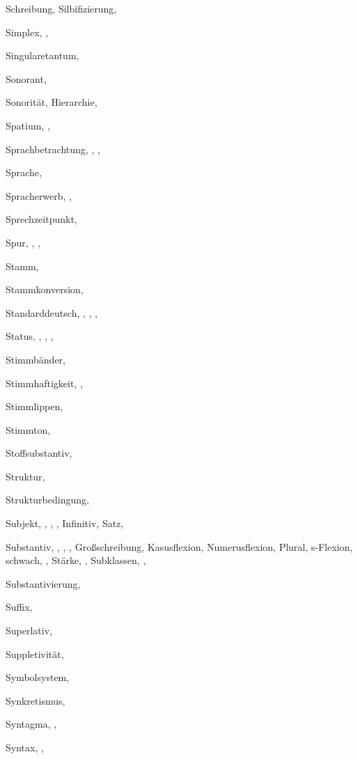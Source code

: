 \begin{theindex}
    \subitem Schreibung, 
    \subitem Silbifizierung, 
  \item Simplex, , 
  \item Singularetantum, 
  \item Sonorant, 
  \item Sonorität, 
    \subitem Hierarchie, 
  \item Spatium, , 
  \item Sprachbetrachtung, , , 
  \item Sprache, 
  \item Spracherwerb, , 
  \item Sprechzeitpunkt, 
  \item Spur, , , 
  \item Stamm, 
  \item Stammkonversion, 
  \item Standarddeutsch, , , , 
  \item Status, , , , 
  \item Stimmbänder, 
  \item Stimmhaftigkeit, , 
  \item Stimmlippen, 
  \item Stimmton, 
  \item Stoffsubstantiv, 
  \item Struktur, 
  \item Strukturbedingung, 
  \item Subjekt, , , , 
    \subitem Infinitiv, 
    \subitem Satz, 
  \item Substantiv, , , , 
    \subitem Großschreibung, 
    \subitem Kasusflexion, 
    \subitem Numerusflexion, 
    \subitem Plural, 
    \subitem s-Flexion, 
    \subitem schwach, , 
    \subitem Stärke, , 
    \subitem Subklassen, , 
  \item Substantivierung, 
  \item Suffix, 
  \item Superlativ, 
  \item Suppletivität, 
  \item Symbolsystem, 
  \item Synkretismus, 
  \item Syntagma, , 
  \item Syntax, , 


\end{theindex}
